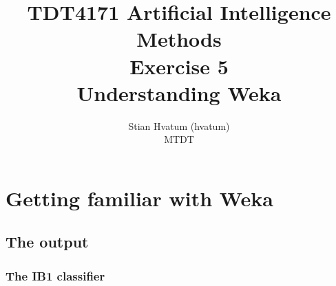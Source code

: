 \documentclass[english,a4paper]{article}
\title{TDT4171 Artificial Intelligence Methods\\
\Small Exercise 5\\
\Huge Understanding Weka}
\author{Stian Hvatum (hvatum)\\MTDT}
\begin{document}
\maketitle
\thispagestyle{empty}
\newpage
{}
\tableofcontents
\newpage
{}

\section{Getting familiar with Weka}
\subsection{The output}
\subsubsection{The IB1 classifier}
\end{document}
